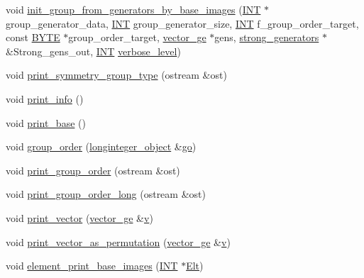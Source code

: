\begin{DoxyCompactItemize}
\item 
void \mbox{\hyperlink{classaction_a4e5304907b6de4cdd1dc77bf7015b2cf}{init\+\_\+group\+\_\+from\+\_\+generators\+\_\+by\+\_\+base\+\_\+images}} (\mbox{\hyperlink{galois_8h_a09fddde158a3a20bd2dcadb609de11dc}{I\+NT}} $\ast$group\+\_\+generator\+\_\+data, \mbox{\hyperlink{galois_8h_a09fddde158a3a20bd2dcadb609de11dc}{I\+NT}} group\+\_\+generator\+\_\+size, \mbox{\hyperlink{galois_8h_a09fddde158a3a20bd2dcadb609de11dc}{I\+NT}} f\+\_\+group\+\_\+order\+\_\+target, const \mbox{\hyperlink{galois_8h_ab6cc7b4aeb6ea31aba2b3fbfc83ff5e6}{B\+Y\+TE}} $\ast$group\+\_\+order\+\_\+target, \mbox{\hyperlink{classvector__ge}{vector\+\_\+ge}} $\ast$gens, \mbox{\hyperlink{classstrong__generators}{strong\+\_\+generators}} $\ast$\&Strong\+\_\+gens\+\_\+out, \mbox{\hyperlink{galois_8h_a09fddde158a3a20bd2dcadb609de11dc}{I\+NT}} \mbox{\hyperlink{simeon_8_c_a818073fbcc2f439e7c56952f67386122}{verbose\+\_\+level}})
\item 
void \mbox{\hyperlink{classaction_aed811766c7e64fe2c853df8b0b67aa6e}{print\+\_\+symmetry\+\_\+group\+\_\+type}} (ostream \&ost)
\item 
void \mbox{\hyperlink{classaction_a6f89e493e5c5a32e5c3b8963d438ce86}{print\+\_\+info}} ()
\item 
void \mbox{\hyperlink{classaction_a6ac1c35b58155659d22359820a3ae18a}{print\+\_\+base}} ()
\item 
void \mbox{\hyperlink{classaction_ad1f69adb27041311d2e7be96e39388d4}{group\+\_\+order}} (\mbox{\hyperlink{classlonginteger__object}{longinteger\+\_\+object}} \&\mbox{\hyperlink{simeon_8_c_a1516b736c8ebbfb03a9dd7d8826cd9a6}{go}})
\item 
void \mbox{\hyperlink{classaction_aaf5533b61c20a11f8c0efcf7ff718d7d}{print\+\_\+group\+\_\+order}} (ostream \&ost)
\item 
void \mbox{\hyperlink{classaction_a75c89bc9786a75b63d42429f03160230}{print\+\_\+group\+\_\+order\+\_\+long}} (ostream \&ost)
\item 
void \mbox{\hyperlink{classaction_a2c91e488a2fdc2b8b4e6f25dfc992929}{print\+\_\+vector}} (\mbox{\hyperlink{classvector__ge}{vector\+\_\+ge}} \&\mbox{\hyperlink{simeon_8_c_aeb3f3030944801b163bc3b829a7f6710}{v}})
\item 
void \mbox{\hyperlink{classaction_a9611a3c993adc3979c430a680c748b14}{print\+\_\+vector\+\_\+as\+\_\+permutation}} (\mbox{\hyperlink{classvector__ge}{vector\+\_\+ge}} \&\mbox{\hyperlink{simeon_8_c_aeb3f3030944801b163bc3b829a7f6710}{v}})
\item 
void \mbox{\hyperlink{classaction_a2b9adf554aaa2eb6caf62396133ecf35}{element\+\_\+print\+\_\+base\+\_\+images}} (\mbox{\hyperlink{galois_8h_a09fddde158a3a20bd2dcadb609de11dc}{I\+NT}} $\ast$\mbox{\hyperlink{simeon_8_c_aec1406935bdb1fee3561fcb840964100}{Elt}})

\end{DoxyCompactItemize}
